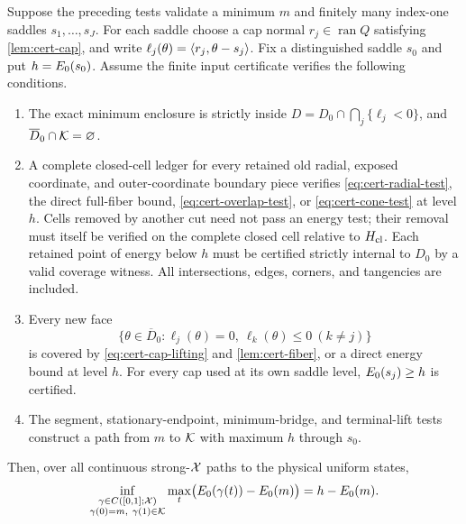\begin{theorem}\label{thm:certificate}
Suppose the preceding tests validate a minimum $m$ and finitely many
index-one saddles $s_1,\ldots,s_J$. For each saddle choose a cap normal
$r_j\in\operatorname{ran}Q$ satisfying
\cref{lem:cert-cap}, and write
$\ell_j(\theta)=\left\langle r_j,\theta-s_j\right\rangle$.
Fix a distinguished saddle $s_0$ and put $h=E_0(s_0)$. Assume the finite
input certificate verifies the following conditions.
\begin{enumerate}
\item The exact minimum enclosure is strictly inside
$D=D_0\cap\bigcap_j\{\ell_j<0\}$, and
$\overline D_0\cap\mathcal K=\varnothing$.
\item A complete closed-cell ledger for every retained old radial,
exposed coordinate, and outer-coordinate boundary piece verifies
\eqref{eq:cert-radial-test}, the direct full-fiber bound,
\eqref{eq:cert-overlap-test}, or \eqref{eq:cert-cone-test} at level $h$.
Cells removed by another cut need not pass an energy test; their removal
must itself be verified on the complete closed cell relative to
$H_{\rm cl}$. Each retained point of energy below $h$ must be certified
strictly internal to $D_0$ by a valid coverage witness. All intersections,
edges, corners, and tangencies are included.
\item Every new face
\[
 \{\theta\in\overline D_0:\ell_j(\theta)=0,
                         \ \ell_k(\theta)\le0\ (k\ne j)\}
\]
is covered by \eqref{eq:cert-cap-lifting} and
\cref{lem:cert-fiber}, or a direct energy bound at level $h$.
For every cap used at its own saddle level, $E_0(s_j)\ge h$ is certified.
\item The segment, stationary-endpoint, minimum-bridge, and terminal-lift
tests construct a path from $m$ to $\mathcal K$ with maximum $h$ through $s_0$.
\end{enumerate}
Then, over all continuous strong-$\mathcal X$ paths to the physical uniform
states,
\begin{equation}\label{eq:cert-global-identity}
 \inf_{\substack{\gamma\in C([0,1];\mathcal X)\\
        \gamma(0)=m,\ \gamma(1)\in\mathcal K}}
 \max_t\bigl(E_0(\gamma(t))-E_0(m)\bigr)
       =h-E_0(m).
\end{equation}
\end{theorem}
